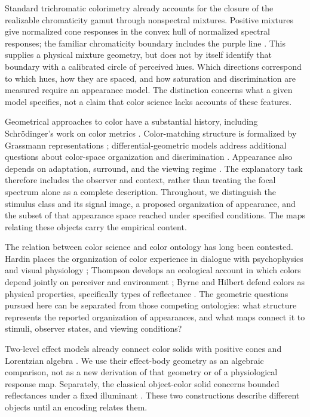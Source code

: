 \documentclass[11pt,letterpaper]{article}
\theoremstyle{plain}
\begin{document}
Standard trichromatic colorimetry already accounts for the closure of the realizable chromaticity gamut through nonspectral mixtures. Positive mixtures give normalized cone responses in the convex hull of normalized spectral responses; the familiar chromaticity boundary includes the purple line \cite{StockmanRider2023}. This supplies a physical mixture geometry, but does not by itself identify that boundary with a calibrated circle of perceived hues. Which directions correspond to which hues, how they are spaced, and how saturation and discrimination are measured require an appearance model. The distinction concerns what a given model specifies, not a claim that color science lacks accounts of these features.

Geometrical approaches to color have a substantial history, including Schr\"odinger's work on color metrics \cite{Schrodinger1920}. Color-matching structure is formalized by Grassmann representations \cite{Krantz1975}; differential-geometric models address additional questions about color-space organization and discrimination \cite{Resnikoff1974}. Appearance also depends on adaptation, surround, and the viewing regime \cite{Shevell2003,Fairchild2013}. The explanatory task therefore includes the observer and context, rather than treating the focal spectrum alone as a complete description. Throughout, we distinguish the stimulus class and its signal image, a proposed organization of appearance, and the subset of that appearance space reached under specified conditions. The maps relating these objects carry the empirical content.

The relation between color science and color ontology has long been contested. Hardin places the organization of color experience in dialogue with psychophysics and visual physiology \cite{Hardin1988}; Thompson develops an ecological account in which colors depend jointly on perceiver and environment \cite{Thompson1995}; Byrne and Hilbert defend colors as physical properties, specifically types of reflectance \cite{ByrneHilbert2003}. The geometric questions pursued here can be separated from those competing ontologies: what structure represents the reported organization of appearances, and what maps connect it to stimuli, observer states, and viewing conditions?

Two-level effect models already connect color solids with positive cones and Lorentzian algebra \cite{Berthier2020,BerthierProvenzi2022}. We use their effect-body geometry as an algebraic comparison, not as a new derivation of that geometry or of a physiological response map. Separately, the classical object-color solid concerns bounded reflectances under a fixed illuminant \cite{Koenderink2010,Logvinenko2025}. These two constructions describe different objects until an encoding relates them.
\end{document}
